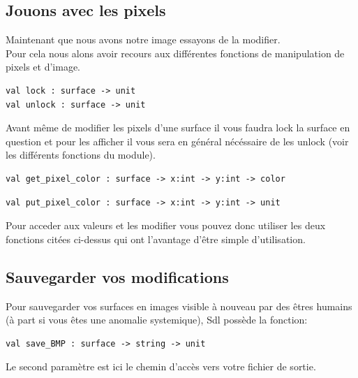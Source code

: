 \documentclass[a4paper]{article}
\begin{document}
\subsection{Jouons avec les pixels}

Maintenant que nous avons notre image essayons de la modifier.\\
Pour cela nous alons avoir recours aux différentes fonctions de manipulation de pixels et d'image.\\

\vspace{3mm}
\begin{verbatim}
val lock : surface -> unit
val unlock : surface -> unit
\end{verbatim}
\vspace{3mm}
Avant même de modifier les pixels d'une surface il vous faudra lock la surface en question et pour 
les afficher il vous sera en général nécéssaire de les unlock (voir les différents fonctions du module).
\newpage

\vspace{3mm}
\begin{verbatim}
val get_pixel_color : surface -> x:int -> y:int -> color
\end{verbatim}
\vspace{3mm}

\vspace{3mm}
\begin{verbatim}
val put_pixel_color : surface -> x:int -> y:int -> unit
\end{verbatim}
\vspace{3mm}

Pour acceder aux valeurs et les modifier vous pouvez donc utiliser les deux fonctions citées ci-dessus qui ont 
l'avantage d'être simple d'utilisation.

\subsection{Sauvegarder vos modifications}

Pour sauvegarder vos surfaces en images visible à nouveau par des êtres humains (à part si vous êtes une anomalie systemique), 
Sdl possède la fonction:

\vspace{3mm}
\begin{verbatim}
val save_BMP : surface -> string -> unit
\end{verbatim}
\vspace{3mm}
Le second paramètre est ici le chemin d'accès vers votre fichier de sortie.
\end{document}
